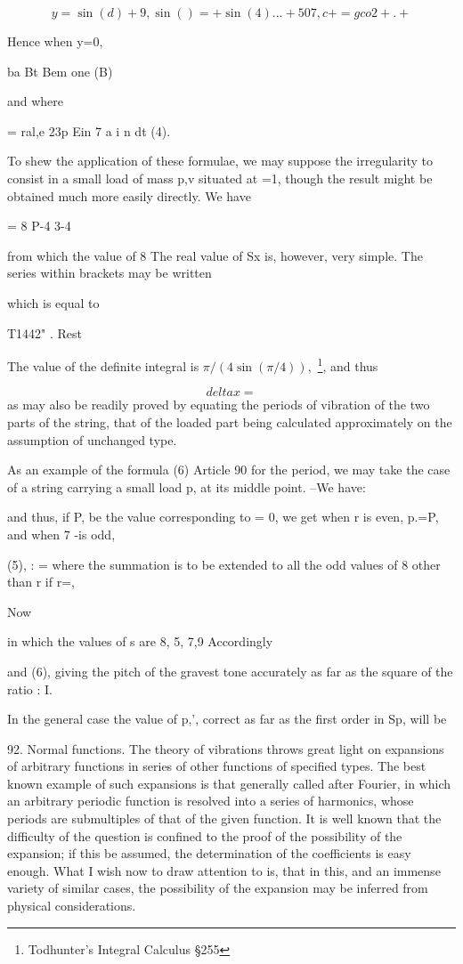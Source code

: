 \[y= \sin(d) +9, \sin()= + \sin(4)...  +507 ,c + = g co 2 +. +\]

Hence when y=0,

ba Bt Bem one (B)

and where

= ral,e 23p Ein 7 a i n dt (4).

To shew the application of these formulae, we may suppose the irregularity to
consist in a small load of mass p,v situated at =1, though the result might be
obtained much more easily directly. We have

= 8 P-4 3-4

from which the value of 8 The real value of Sx is, however, very simple.  The
series within brackets may be written

which is equal to

T1442" . Rest

The value of the definite integral is \(\pi/(4 \sin(\pi/4)),\)
\footnote{Todhunter's Integral Calculus \S 255}, and thus

\[ delta x = \]
as may also be readily proved by equating the periods of
vibration of the two parts of the string, that of the loaded part being
calculated approximately on the assumption of unchanged type.

As an example of the formula (6) Article 90 for the period, we may take the
case of a string carrying a small load p, at its middle point. --We have:

and thus, if P, be the value corresponding to = 0, we get when r is even, p.=P,
and when 7 -is odd,

(5), : = where the summation is to be extended to all the odd values of 8
other than r if r=,

Now

in which the values of s are 8, 5, 7,9 Accordingly

and (6), giving the pitch of the gravest tone accurately as far as the square
of the ratio : I.

In the general case the value of p,', correct as far as the first order in Sp,
will be

92. Normal functions.  The theory of vibrations throws great light on
expansions of arbitrary functions in series of other functions of specified
types. The best known example of such expansions is that generally called after
Fourier, in which an arbitrary periodic function is resolved into a series of
harmonics, whose periods are submultiples of that of the given function. It is
well known that the difficulty of the question is confined to the proof of the
possibility of the expansion; if this be assumed, the determination of the
coefficients is easy enough. What I wish now to draw attention to is, that in
this, and an immense variety of similar cases, the possibility of the expansion
may be inferred from physical considerations.

